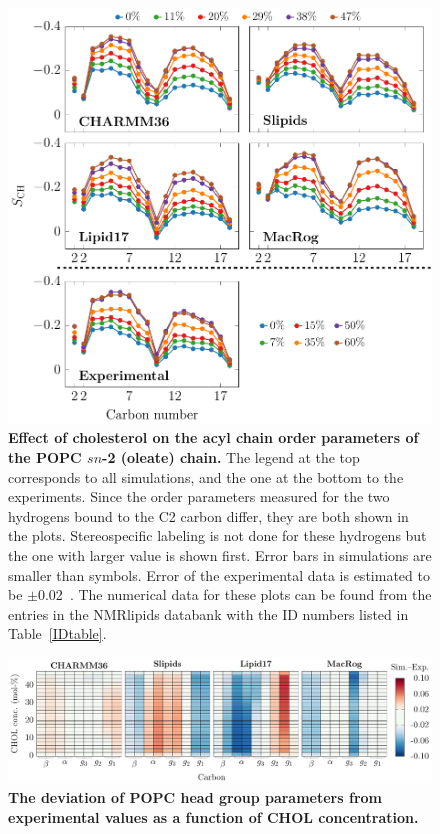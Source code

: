 \documentclass[journal=jpcbfk,manuscript=suppinfo]{achemso}
\begin{document}
\begin{figure}[htb!]
    \centering
    \includegraphics[width=0.9\linewidth]{../FIGS/oleate.pdf}
    \caption{\label{SIfig:oleate}%
     \textbf{Effect of cholesterol on the acyl chain order parameters of the POPC $sn$-2 (oleate) chain.}
     The legend at the top corresponds to all simulations, and the one at the bottom to the experiments. Since the order parameters measured for the two hydrogens bound to the C2 carbon differ, they are both shown in the plots. Stereospecific labeling is not done for these hydrogens but the one with larger value is shown first. Error bars in simulations are smaller than symbols. Error of the experimental data is estimated to be $\pm$0.02~\cite{Ollila16}. The numerical data for these plots can be found from the entries in the NMRlipids databank with the ID numbers listed in Table~\ref{IDtable}.
    }
\end{figure}

\begin{figure}[htb!]
    \centering
    \includegraphics[width=\linewidth]{../FIGS/OP_headgroup.pdf}
    \caption{\label{SIfig:headgroups}%
     \textbf{The deviation of POPC head group parameters from experimental values as a function of CHOL concentration.}
    }
\end{figure}
\end{document}
